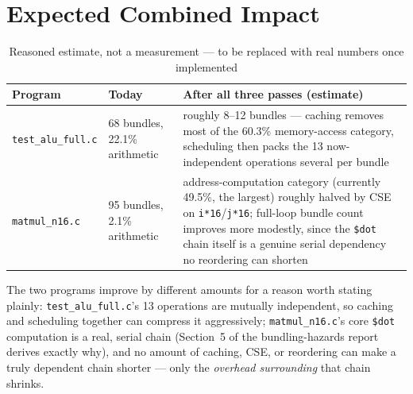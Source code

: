 \documentclass[11pt,a4paper]{article}
\begin{document}
\section{Expected Combined Impact}

\begin{table}[h]
\centering
\caption{Reasoned estimate, not a measurement --- to be replaced with real numbers once implemented}
\begin{tabular}{@{}p{4.0cm}p{4.0cm}p{4.6cm}@{}}
\toprule
Program & Today & After all three passes (estimate) \\
\midrule
\texttt{test\_alu\_full.c} & 68 bundles, 22.1\% arithmetic & roughly 8--12 bundles ---
  caching removes most of the 60.3\% memory-access category, scheduling then packs the
  13 now-independent operations several per bundle \\
\texttt{matmul\_n16.c} & 95 bundles, 2.1\% arithmetic & address-computation category
  (currently 49.5\%, the largest) roughly halved by CSE on \texttt{i*16}/\texttt{j*16};
  full-loop bundle count improves more modestly, since the \texttt{\$dot} chain itself is
  a genuine serial dependency no reordering can shorten \\
\bottomrule
\end{tabular}
\end{table}

The two programs improve by different amounts for a reason worth stating plainly:
\texttt{test\_alu\_full.c}'s 13 operations are mutually independent, so caching and
scheduling together can compress it aggressively; \texttt{matmul\_n16.c}'s core
\texttt{\$dot} computation is a real, serial chain (Section~5 of the bundling-hazards
report derives exactly why), and no amount of caching, CSE, or reordering can make a
truly dependent chain shorter --- only the \emph{overhead surrounding} that chain shrinks.
\end{document}
